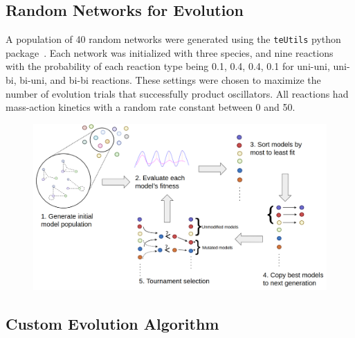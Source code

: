 \documentclass[12pt]{report}
\begin{document}
\subsection{Random Networks for Evolution}
A population of 40 random networks were generated using the {\tt teUtils} python package~\cite{SauroteUtils_2020}. Each network was initialized with three species, and nine reactions with the probability of each reaction type being 0.1, 0.4, 0.4, 0.1 for uni-uni, uni-bi, bi-uni, and bi-bi reactions. These settings were chosen to maximize the number of evolution trials that successfully product oscillators. All reactions had mass-action kinetics with a random rate constant between 0 and 50. 
\begin{figure}
\begin{center}
    \includegraphics[width=17cm]{images/algorithm.png}
    \label{fig:algorithm}
    \end{center}
\end{figure}

\subsection{Custom Evolution Algorithm}
\end{document}
